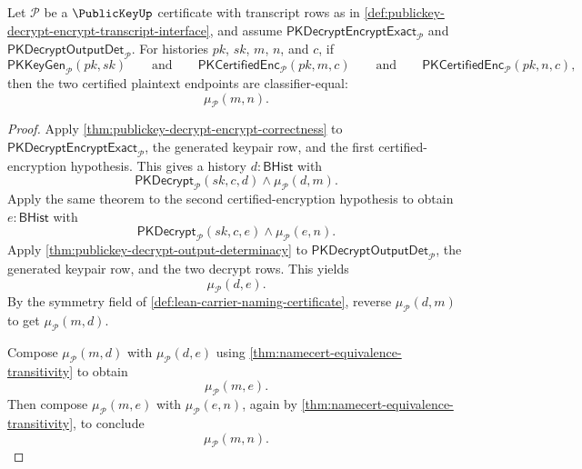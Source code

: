 \begin{theorem}
\label{thm:publickey-certified-ciphertext-plaintext-uniqueness}
Let $\mathcal P$ be a $\PublicKeyUp$ certificate with transcript rows as in \autoref{def:publickey-decrypt-encrypt-transcript-interface}, and assume $\mathsf{PKDecryptEncryptExact}_{\mathcal P}$ and $\mathsf{PKDecryptOutputDet}_{\mathcal P}$. For histories $pk$, $sk$, $m$, $n$, and $c$, if
$$
\mathsf{PKKeyGen}_{\mathcal P}(pk,sk)
\qquad\text{and}
\qquad
\mathsf{PKCertifiedEnc}_{\mathcal P}(pk,m,c)
\qquad\text{and}
\qquad
\mathsf{PKCertifiedEnc}_{\mathcal P}(pk,n,c),
$$
then the two certified plaintext endpoints are classifier-equal:
$$
\mu_{\mathcal P}(m,n).
$$
\end{theorem}
\begin{proof}
Apply \autoref{thm:publickey-decrypt-encrypt-correctness} to $\mathsf{PKDecryptEncryptExact}_{\mathcal P}$, the generated keypair row, and the first certified-encryption hypothesis. This gives a history $d:\mathsf{BHist}$ with
$$
\mathsf{PKDecrypt}_{\mathcal P}(sk,c,d)\land\mu_{\mathcal P}(d,m).
$$
Apply the same theorem to the second certified-encryption hypothesis to obtain $e:\mathsf{BHist}$ with
$$
\mathsf{PKDecrypt}_{\mathcal P}(sk,c,e)\land\mu_{\mathcal P}(e,n).
$$
Apply \autoref{thm:publickey-decrypt-output-determinacy} to $\mathsf{PKDecryptOutputDet}_{\mathcal P}$, the generated keypair row, and the two decrypt rows. This yields
$$
\mu_{\mathcal P}(d,e).
$$
By the symmetry field of \autoref{def:lean-carrier-naming-certificate}, reverse $\mu_{\mathcal P}(d,m)$ to get $\mu_{\mathcal P}(m,d)$.

Compose $\mu_{\mathcal P}(m,d)$ with $\mu_{\mathcal P}(d,e)$ using \autoref{thm:namecert-equivalence-transitivity} to obtain
$$
\mu_{\mathcal P}(m,e).
$$
Then compose $\mu_{\mathcal P}(m,e)$ with $\mu_{\mathcal P}(e,n)$, again by \autoref{thm:namecert-equivalence-transitivity}, to conclude
$$
\mu_{\mathcal P}(m,n).
$$
\end{proof}

